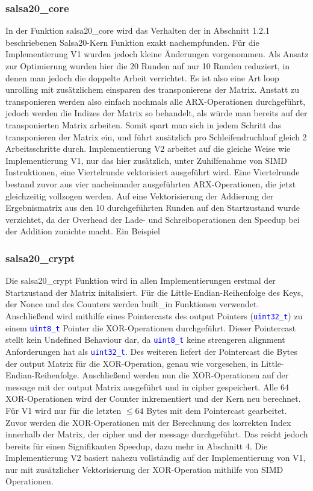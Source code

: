 \documentclass[course=erap]{aspdoc}
\begin{document}
\subsubsection{salsa20\_core}
In der Funktion salsa20\_core wird das Verhalten der in Abschnitt 1.2.1 beschriebenen Salsa20-Kern Funktion exakt nachempfunden. Für die Implementierung V1 wurden jedoch kleine Änderungen vorgenommen.
Als Ansatz zur Optimierung wurden hier die 20 Runden auf nur 10 Runden reduziert, in denen man jedoch die doppelte Arbeit verrichtet. Es ist also eine Art loop unrolling mit zusätzlichem einsparen des 
transponierens der Matrix. Anstatt zu transponieren werden also einfach nochmals alle ARX-Operationen durchgeführt, jedoch werden die Indizes der Matrix so behandelt, als würde man bereits auf
der transponierten Matrix arbeiten. Somit spart man sich in jedem Schritt das transponieren der Matrix ein, und führt zusätzlich pro Schleifendruchlauf gleich 2 Arbeitsschritte durch. Implementierung V2
arbeitet auf die gleiche Weise wie Implementierung V1, nur das hier zusätzlich, unter Zuhilfenahme von SIMD Instruktionen, eine Viertelrunde vektorisiert ausgeführt wird. Eine Viertelrunde bestand zuvor 
aus vier nacheinander ausgeführten ARX-Operationen, die jetzt gleichzeitig vollzogen werden. Auf eine Vektorisierung der Addierung der Ergebnismatrix aus den 10 durchgeführten Runden auf den Startzustand wurde verzichtet,
da der Overhead der Lade- und Schreiboperationen den Speedup bei der Addition zunichte macht.
Ein Beispiel

\subsubsection{salsa20\_crypt} \label{crypt}
Die salsa20\_crypt Funktion wird in allen Implementierungen erstmal der Startzustand der Matrix initalisiert. Für die Little-Endian-Reihenfolge des Keys, der Nonce und des Counters werden built\_in Funktionen verwendet.
Anschließend wird mithilfe eines Pointercasts des output Pointers (\texttt{\textcolor{blue}{uint32\_t}}) zu einem \texttt{\textcolor{blue}{uint8\_t}} Pointer die XOR-Operationen durchgeführt. Dieser Pointercast stellt kein Undefined Behaviour dar, 
da \texttt{\textcolor{blue}{uint8\_t}} keine strengeren alignment Anforderungen hat als \texttt{\textcolor{blue}{uint32\_t}}. Des weiteren liefert der Pointercast die Bytes der output Matrix für die XOR-Operation, genau wie vorgesehen, in Little-Endian-Reihenfolge.
Anschließend werden nun die XOR-Operationen auf der message mit der output Matrix ausgeführt und in cipher gespeichert. Alle 64 XOR-Operationen wird der Counter inkrementiert und der Kern neu berechnet. Für V1 wird nur für die letzten $\leq 64$ Bytes mit dem Pointercast gearbeitet.
Zuvor werden die XOR-Operationen mit der Berechnung des korrekten Index innerhalb der Matrix, der cipher und der message durchgeführt. Das reicht jedoch bereits für einen Signifikanten Speedup, dazu mehr in Abschnitt 4.
Die Implementierung V2 basiert nahezu vollständig auf der Implementierung von V1, nur mit zusätzlicher Vektorisierung der XOR-Operation mithilfe von SIMD Operationen.
\end{document}
